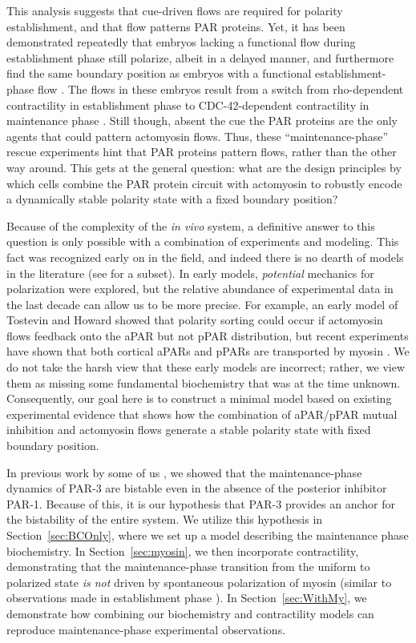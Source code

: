 \documentclass[11pt]{article}
\newcommand{\6}[1]{#1_{\text{6}}}
\newcommand{\3}[1]{#1_{\text{3}}}
\begin{document}
This analysis suggests that cue-driven flows are required for polarity establishment, and that flow patterns PAR proteins. Yet, it has been demonstrated repeatedly that embryos lacking a functional flow during establishment phase still polarize, albeit in a delayed manner, and furthermore find the same boundary position as embryos with a functional establishment-phase flow \cite{zonies2010symmetry, tse2012rhoa}. The flows in these embryos result from a switch from rho-dependent contractility in establishment phase to CDC-42-dependent contractility in maintenance phase \cite{schonegg2006cdc}. Still though, absent the cue the PAR proteins are the only agents that could pattern actomyosin flows. Thus, these ``maintenance-phase'' rescue experiments hint that PAR proteins pattern flows, rather than the other way around. This gets at the general question: what are the design principles by which cells combine the PAR protein circuit with actomyosin to robustly encode a dynamically stable polarity state with a fixed boundary position?

Because of the complexity of the \emph{in vivo} system, a definitive answer to this question is only possible with a combination of experiments and modeling. This fact was recognized early on in the field, and indeed there is no dearth of models in the literature (see \cite{TH2008, dawes20113, dawes2013cortical, gessele2020geometric, gross2019guiding, goehring2011polarization, kravtsova2014actomyosin} for a subset). In early models, \emph{potential} mechanics for polarization were explored, but the relative abundance of experimental data in the last decade can allow us to be more precise. For example, an early model of Tostevin and Howard showed that polarity sorting could occur if actomyosin flows feedback onto the aPAR \cite{TH2008} but not pPAR distribution, but recent experiments have shown that both cortical aPARs and pPARs are transported by myosin \cite{illukkumbura2023design}. We do not take the harsh view that these early models are incorrect; rather, we view them as missing some fundamental biochemistry that was at the time unknown. Consequently, our goal here is to construct a minimal model based on existing experimental evidence that shows how the combination of aPAR/pPAR mutual inhibition and actomyosin flows generate a stable polarity state with fixed boundary position. 

In previous work by some of us \cite{lang2023oligomerization}, we showed that the maintenance-phase dynamics of PAR-3 are bistable even in the absence of the posterior inhibitor PAR-1. Because of this, it is our hypothesis that PAR-3 provides an anchor for the bistability of the entire system. We utilize this hypothesis in Section\ \ref{sec:BCOnly}, where we set up a model describing the maintenance phase biochemistry. In Section\ \ref{sec:myosin}, we then incorporate contractility, demonstrating that the maintenance-phase transition from the uniform to polarized state \emph{is not} driven by spontaneous polarization of myosin (similar to observations made in establishment phase \cite{nishikawa2017controlling}). In Section\ \ref{sec:WithMy}, we demonstrate how combining our biochemistry and contractility models can reproduce maintenance-phase experimental observations.
\end{document}
